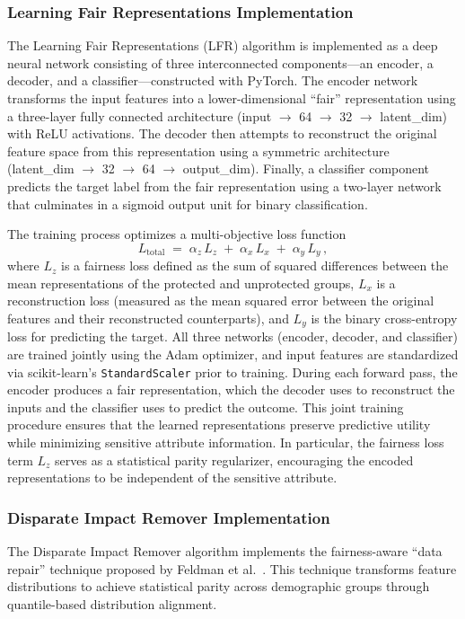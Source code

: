 \documentclass[12pt,a4paper,openright,twoside]{book}
\begin{document}
\subsubsection{Learning Fair Representations Implementation}
The Learning Fair Representations (LFR) algorithm is implemented as a deep neural network consisting of three interconnected components—an encoder, a decoder, and a classifier—constructed with PyTorch. The encoder network transforms the input features into a lower-dimensional “fair” representation using a three-layer fully connected architecture (input $\to$ 64 $\to$ 32 $\to$ latent\_dim) with ReLU activations. The decoder then attempts to reconstruct the original feature space from this representation using a symmetric architecture (latent\_dim $\to$ 32 $\to$ 64 $\to$ output\_dim). Finally, a classifier component predicts the target label from the fair representation using a two-layer network that culminates in a sigmoid output unit for binary classification.

The training process optimizes a multi-objective loss function 
\[ 
L_{\text{total}} \;=\; \alpha_z\,L_z \;+\; \alpha_x\,L_x \;+\; \alpha_y\,L_y\,,
\] 
where $L_z$ is a fairness loss defined as the sum of squared differences between the mean representations of the protected and unprotected groups, $L_x$ is a reconstruction loss (measured as the mean squared error between the original features and their reconstructed counterparts), and $L_y$ is the binary cross-entropy loss for predicting the target. All three networks (encoder, decoder, and classifier) are trained jointly using the Adam optimizer, and input features are standardized via scikit-learn’s \texttt{StandardScaler} prior to training. During each forward pass, the encoder produces a fair representation, which the decoder uses to reconstruct the inputs and the classifier uses to predict the outcome. This joint training procedure ensures that the learned representations preserve predictive utility while minimizing sensitive attribute information. In particular, the fairness loss term $L_z$ serves as a statistical parity regularizer, encouraging the encoded representations to be independent of the sensitive attribute.

\subsubsection{Disparate Impact Remover Implementation}
The Disparate Impact Remover algorithm implements the fairness-aware “data repair” technique proposed by Feldman et al.~\cite{feldman2015certifyingremovingdisparateimpact}. This technique transforms feature distributions to achieve statistical parity across demographic groups through quantile-based distribution alignment.
\end{document}
